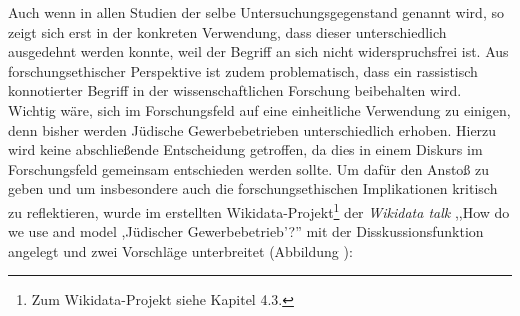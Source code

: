 Auch wenn in allen Studien der selbe Untersuchungsgegenstand genannt wird, so zeigt sich erst in der konkreten Verwendung, dass dieser unterschiedlich ausgedehnt werden konnte, weil der Begriff an sich nicht widerspruchsfrei ist. Aus forschungsethischer Perspektive ist zudem problematisch, dass ein rassistisch konnotierter Begriff in der wissenschaftlichen Forschung beibehalten wird. Wichtig wäre, sich im Forschungsfeld auf eine einheitliche Verwendung zu einigen, denn bisher werden Jüdische Gewerbebetrieben unterschiedlich erhoben. Hierzu wird keine abschließende Entscheidung getroffen, da dies in einem Diskurs im Forschungsfeld gemeinsam entschieden werden sollte. Um dafür den Anstoß zu geben und um insbesondere auch die forschungsethischen Implikationen kritisch zu reflektieren, wurde im erstellten Wikidata-Projekt\footnote{Zum Wikidata-Projekt siehe Kapitel 4.3.} der \textit{Wikidata talk} ,,How do we use and model ,Jüdischer Gewerbebetrieb'?'' mit der Disskussionsfunktion angelegt und zwei Vorschläge unterbreitet (Abbildung ): 

